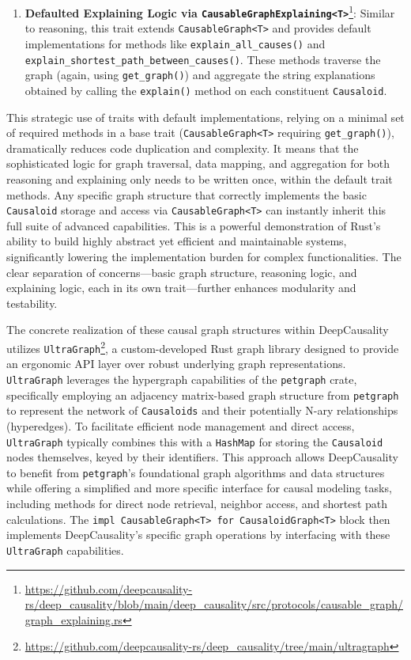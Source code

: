 \begin{enumerate}
    \item \textbf{Defaulted Explaining Logic via \texttt{CausableGraphExplaining<T>}}\footnote{\url{https://github.com/deepcausality-rs/deep_causality/blob/main/deep_causality/src/protocols/causable_graph/graph_explaining.rs}}: Similar to reasoning, this trait extends \texttt{CausableGraph<T>} and provides default implementations for methods like \texttt{explain\_all\_causes()} and \texttt{explain\_shortest\_path\_between\_causes()}. These methods traverse the graph (again, using \texttt{get\_graph()}) and aggregate the string explanations obtained by calling the \texttt{explain()} method on each constituent \texttt{Causaloid}.
\end{enumerate}
This strategic use of traits with default implementations, relying on a minimal set of required methods in a base trait (\texttt{CausableGraph<T>} requiring \texttt{get\_graph()}), dramatically reduces code duplication and complexity. It means that the sophisticated logic for graph traversal, data mapping, and aggregation for both reasoning and explaining only needs to be written once, within the default trait methods. Any specific graph structure that correctly implements the basic \texttt{Causaloid} storage and access via \texttt{CausableGraph<T>} can instantly inherit this full suite of advanced capabilities. This is a powerful demonstration of Rust's ability to build highly abstract yet efficient and maintainable systems, significantly lowering the implementation burden for complex functionalities. The clear separation of concerns—basic graph structure, reasoning logic, and explaining logic, each in its own trait—further enhances modularity and testability.

The concrete realization of these causal graph structures within DeepCausality utilizes \texttt{UltraGraph}\footnote{\url{https://github.com/deepcausality-rs/deep_causality/tree/main/ultragraph}}, a custom-developed Rust graph library designed to provide an ergonomic API layer over robust underlying graph representations. \texttt{UltraGraph} leverages the hypergraph capabilities of the \texttt{petgraph} crate, specifically employing an adjacency matrix-based graph structure from \texttt{petgraph} to represent the network of \texttt{Causaloids} and their potentially N-ary relationships (hyperedges). To facilitate efficient node management and direct access, \texttt{UltraGraph} typically combines this with a \texttt{HashMap} for storing the \texttt{Causaloid} nodes themselves, keyed by their identifiers. This approach allows DeepCausality to benefit from \texttt{petgraph}'s foundational graph algorithms and data structures while offering a simplified and more specific interface for causal modeling tasks, including methods for direct node retrieval, neighbor access, and shortest path calculations. The \texttt{impl CausableGraph<T> for CausaloidGraph<T>} block then implements DeepCausality's specific graph operations by interfacing with these \texttt{UltraGraph} capabilities.

